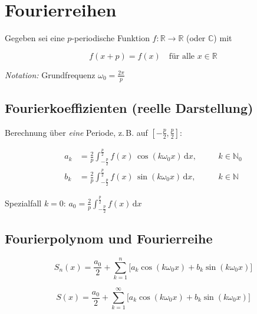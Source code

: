 \documentclass[a4paper,11pt,oneside,open=any,parskip=half, DIV=15]{scrreprt}
\begin{document}
\newpage

\section{Fourierreihen}

   Gegeben sei eine \(p\)-periodische Funktion \(f:\mathbb{R}\to\mathbb{R}\) (oder \(\mathbb{C}\)) mit
   \begin{importantbox}
      \[
         f(x+p)=f(x)\quad\text{für alle }x\in\mathbb{R}
      \]
   \end{importantbox}
   \emph{Notation:} Grundfrequenz \(\omega_0=\tfrac{2\pi}{p}\)

   \subsection*{Fourierkoeffizienten (reelle Darstellung)}
      Berechnung über \emph{eine} Periode, z.\,B. auf \([-\tfrac p2,\tfrac p2]\):
      \begin{importantbox}
         \[
            \begin{aligned}
               a_k &= \frac{2}{p}\int_{-\frac{p}{2}}^{\frac{p}{2}} f(x)\,\cos(k\omega_0 x)\,\mathrm{d}x, \quad &&k\in\mathbb{N}_0\\[0.3em]
               b_k &= \frac{2}{p}\int_{-\frac{p}{2}}^{\frac{p}{2}} f(x)\,\sin(k\omega_0 x)\,\mathrm{d}x, \quad &&k\in\mathbb{N}
            \end{aligned}
         \]
      \end{importantbox}
      Spezialfall \(k=0\): \(\displaystyle a_0=\frac{2}{p}\int_{-\frac{p}{2}}^{\frac{p}{2}} f(x)\,\mathrm{d}x\)

   \subsection*{Fourierpolynom und Fourierreihe}
      \begin{importantbox}
         \[
            S_n(x)=\frac{a_0}{2}+\sum_{k=1}^{n}\Big[a_k\cos(k\omega_0 x)+b_k\sin(k\omega_0 x)\Big]
         \]
      \end{importantbox}

      \begin{importantbox}
         \[
            S(x)=\frac{a_0}{2}+\sum_{k=1}^{\infty}\Big[a_k\cos(k\omega_0 x)+b_k\sin(k\omega_0 x)\Big]
         \]
      \end{importantbox}
\end{document}
